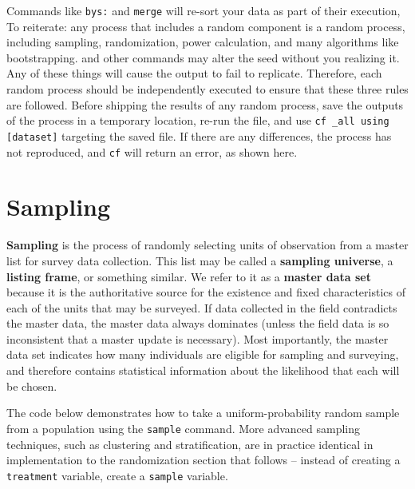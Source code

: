 
Commands like \texttt{bys:} and \texttt{merge} will re-sort your data as part of their execution,
To reiterate: any process that includes a random component
is a random process, including sampling, randomization, power calculation,
and many algorithms like bootstrapping.
and other commands may alter the seed without you realizing it.
Any of these things will cause the output to fail to replicate.
Therefore, each random process should be independently executed
to ensure that these three rules are followed.
Before shipping the results of any random process,
save the outputs of the process in a temporary location,
re-run the file, and use \texttt{cf \_all using [dataset]} targeting the saved file.
If there are any differences, the process has not reproduced,
and \texttt{cf} will return an error, as shown here.


\section{Sampling}

\textbf{Sampling} is the process of randomly selecting units of observation
from a master list for survey data collection.
This list may be called a \textbf{sampling universe}, a \textbf{listing frame}, or something similar.
We refer to it as a \textbf{master data set}
because it is the authoritative source
for the existence and fixed characteristics of each of the units that may be surveyed.
If data collected in the field contradicts the master data,
the master data always dominates
(unless the field data is so inconsistent that a master update is necessary).
Most importantly, the master data set indicates
how many individuals are eligible for sampling and surveying,
and therefore contains statistical information
about the likelihood that each will be chosen.

The code below demonstrates how to take
a uniform-probability random sample
from a population using the \texttt{sample} command.
More advanced sampling techniques,
such as clustering and stratification,
are in practice identical in implementation
to the randomization section that follows --
instead of creating a \texttt{treatment} variable,
create a \texttt{sample} variable.


